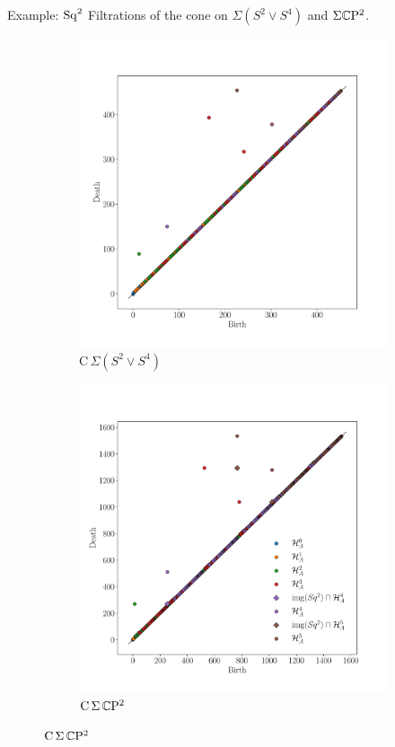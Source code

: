 \begin{frame}{Example: $\operatorname{Sq}^2$}
	\pause
	Filtrations of the cone on $\Sigma(S^2 \vee S^4)$ and $\Sigma \mathbb{C} \mathrm{P}^2$.

	\pause
	\begin{figure}
		\centering
		\begin{subfigure}[b]{0.49\textwidth}
			\centering
			\includegraphics[width=\textwidth]{aux/s2_s4.pdf}
			\caption{$\mathrm C\,\Sigma(S^2 \vee S^4)$}
			\label{f:s2_s4}
		\end{subfigure}
		\begin{subfigure}[b]{0.49\textwidth}
			\centering
			\includegraphics[width=\textwidth]{aux/cp2.pdf}
			\caption{$\mathrm C\,\Sigma\,\mathbb{C}\mathrm{P}^2$}
			\label{f:cp2}
		\end{subfigure}
	\end{figure}
\end{frame}

